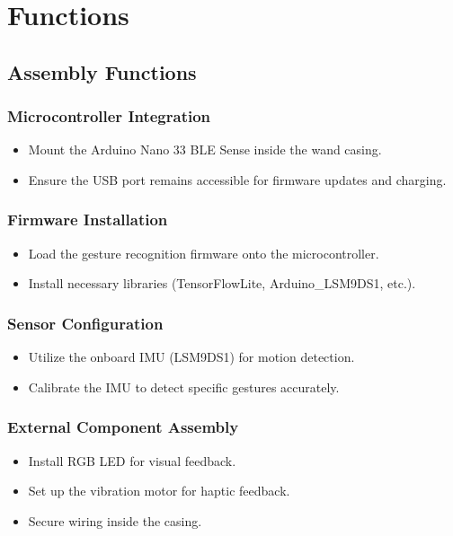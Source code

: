 %
%

\chapter{Functions}

\section{Assembly Functions}

\subsection{Microcontroller Integration}
\begin{itemize}
	\item Mount the Arduino Nano 33 BLE Sense inside the wand casing.
	\item Ensure the USB port remains accessible for firmware updates and charging.
\end{itemize}

\subsection{Firmware Installation}
\begin{itemize}
	\item Load the gesture recognition firmware onto the microcontroller.
	\item Install necessary libraries (TensorFlowLite, Arduino\_LSM9DS1, etc.).
\end{itemize}

\subsection{Sensor Configuration}
\begin{itemize}
	\item Utilize the onboard IMU (LSM9DS1) for motion detection.
	\item Calibrate the IMU to detect specific gestures accurately.
\end{itemize}

\subsection{External Component Assembly}
\begin{itemize}
	\item Install RGB LED for visual feedback.
	\item Set up the vibration motor for haptic feedback.
	\item Secure wiring inside the casing.
\end{itemize}

